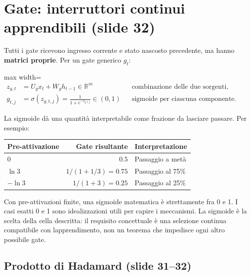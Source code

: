 \documentclass[11pt,a4paper,oneside,openany]{book}
\begin{document}
\section{Gate: interruttori continui apprendibili (slide 32)}\label{f03-r687}

Tutti i gate ricevono ingresso corrente e stato nascosto precedente, ma hanno \textbf{matrici proprie}. Per un gate generico \(g_t\):

\begin{center}
\begin{adjustbox}{max width=\linewidth}
$\displaystyle 
\begin{aligned}
z_{g,t}&=U_gx_t+W_gh_{t-1}\in\mathbb R^m
&&\text{combinazione delle due sorgenti},\\
g_{t,j}&=\sigma(z_{g,t,j})=\frac1{1+e^{-z_{g,t,j}}}\in(0,1)
&&\text{sigmoide per ciascuna componente}.
\end{aligned}
$
\end{adjustbox}
\end{center}

La sigmoide dà una quantità interpretabile come frazione da lasciare passare. Per esempio:

\begin{longtable}[]{@{}lrl@{}}
\toprule\noalign{}
Pre-attivazione & Gate risultante & Interpretazione \\
\midrule\noalign{}
\endhead
\bottomrule\noalign{}
\endlastfoot
\(0\) & \(0.5\) & Passaggio a metà \\
\(\ln3\) & \(1/(1+1/3)=0.75\) & Passaggio al 75\% \\
\(-\ln3\) & \(1/(1+3)=0.25\) & Passaggio al 25\% \\
\end{longtable}

Con pre-attivazioni finite, una sigmoide matematica è strettamente fra 0 e 1. I casi esatti 0 e 1 sono idealizzazioni utili per capire i meccanismi. La sigmoide è la scelta della cella descritta: il requisito concettuale è una selezione continua compatibile con l\textquotesingle apprendimento, non un teorema che impedisce ogni altro possibile gate.

\subsection{Prodotto di Hadamard (slide 31--32)}\label{f03-r710}
\end{document}
